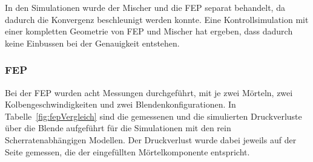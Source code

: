 In den Simulationen wurde der Mischer und die FEP separat behandelt, da dadurch die Konvergenz beschleunigt werden konnte. Eine Kontrollsimulation mit einer kompletten Geometrie von FEP und Mischer hat ergeben, dass dadurch keine Einbussen bei der Genauigkeit entstehen.

\subsubsection{FEP}
Bei der FEP wurden acht Messungen durchgeführt, mit je zwei Mörteln, zwei Kolbengeschwindigkeiten und zwei Blendenkonfigurationen.
In Tabelle~\ref{fig:fepVergleich} sind die gemessenen und die simulierten Druckverluste über die Blende aufgeführt für die Simulationen mit den rein Scherratenabhängigen Modellen. Der Druckverlust wurde dabei jeweils auf der Seite gemessen, die der eingefüllten Mörtelkomponente entspricht.
%
